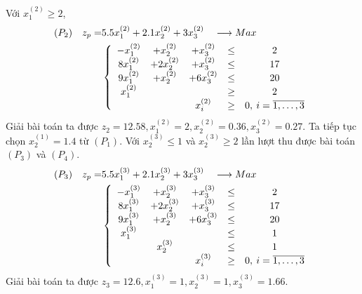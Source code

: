 \documentclass[12pt,a4paper]{report}
\begin{document}
    Với $x^{(2)}_1 \geq 2$, \\
    \begin{equation*}
      \begin{split}
        (P_2) \quad z_p= & 5.5x^{(2)}_1 + 2.1x^{(2)}_2 + 3x^{(2)}_3 \quad \longrightarrow Max \\
        & \left\{\begin{array} {ccccc}
         -x^{(2)}_1 &+ x^{(2)}_2 &+ x^{(2)}_3 &\leq &2 \\
         8x^{(2)}_1 &+ 2x^{(2)}_2 &+ x^{(2)}_3&\leq& 17 \\
         9x^{(2)}_1 &+ x^{(2)}_2 &+ 6x^{(2)}_3 &\leq &20 \\
         x^{(2)}_1 &&&\geq& 2 \\
        &&x^{(2)}_i &\geq &0 , \: i=\overline{\rm 1, \ldots ,3} \\
        \end{array}\right. \\
    \end{split}
    \end{equation*}
    Giải bài toán ta được $z_2=12.58, x^{(2)}_1=2, x^{(2)}_2=0.36, x^{(2)}_3=0.27$. Ta tiếp tục chọn $x^{(1)}_2=1.4$ từ $(P_1)$. Với $x^{(3)}_2 \leq 1$ và $x^{(3)}_2 \geq 2$ lần lượt thu được bài toán $(P_3)$ và $(P_4)$.
    \begin{equation*}
      \begin{split}
          (P_3) \quad z_p= & 5.5x^{(3)}_1 + 2.1x^{(3)}_2 + 3x^{(3)}_3 \quad \longrightarrow Max \\
          & \left\{\begin{array} {ccccc}
           -x^{(3)}_1 &+ x^{(3)}_2 &+ x^{(3)}_3 &\leq& 2 \\
           8x^{(3)}_1 &+ 2x^{(3)}_2 &+ x^{(3)}_3&\leq& 17 \\
           9x^{(3)}_1 &+ x^{(3)}_2 &+ 6x^{(3)}_3 &\leq& 20 \\
           x^{(3)}_1 &&&\leq &1 \\
           &x^{(3)}_2&& \leq &1 \\
          &&x^{(3)}_i &\geq& 0 , \: i=\overline{\rm 1, \ldots ,3} \\
          \end{array}\right. \\
      \end{split}
    \end{equation*}
    Giải bài toán ta được $z_3=12.6, x^{(3)}_1=1, x^{(3)}_2=1, x^{(3)}_3=1.66$.
\end{document}
